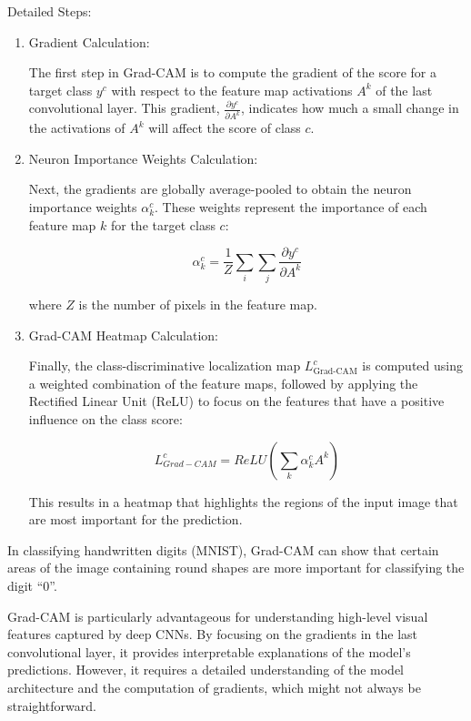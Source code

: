 \documentclass{article}
\begin{document}
Detailed Steps:
\begin{enumerate}
    \item Gradient Calculation:
    
    The first step in Grad-CAM is to compute the gradient of the score for a target class $y^c$ with respect to the feature map activations $A^k$ of the last convolutional layer. This gradient, $\frac{\partial y^c}{\partial A^k}$, indicates how much a small change in the activations of $A^k$ will affect the score of class $c$.
    
    \item Neuron Importance Weights Calculation:
    
    Next, the gradients are globally average-pooled to obtain the neuron importance weights $\alpha^c_k$. These weights represent the importance of each feature map $k$ for the target class $c$:
    
    \begin{equation}
        \alpha^c_k = \dfrac{1}{Z}\sum_{i} \sum_{j} \dfrac{\partial y^c}{\partial A^k}
    \end{equation}
    
    where $Z$ is the number of pixels in the feature map.

    \item Grad-CAM Heatmap Calculation:
    
    Finally, the class-discriminative localization map $L^c_{\text{Grad-CAM}}$ is computed using a weighted combination of the feature maps, followed by applying the Rectified Linear Unit (ReLU) to focus on the features that have a positive influence on the class score:

    \begin{equation}
        L_{Grad-CAM}^{c} = ReLU ( \sum_{k} \alpha^c_k A^k )
    \end{equation}
    
    This results in a heatmap that highlights the regions of the input image that are most important for the prediction.

\end{enumerate}

In classifying handwritten digits (MNIST), Grad-CAM can show that certain areas of the image containing round shapes are more important for classifying the digit “0”.

Grad-CAM is particularly advantageous for understanding high-level visual features captured by deep CNNs. By focusing on the gradients in the last convolutional layer, it provides interpretable explanations of the model’s predictions. However, it requires a detailed understanding of the model architecture and the computation of gradients, which might not always be straightforward.
\end{document}
